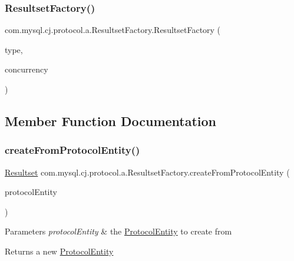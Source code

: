 \subsubsection{\texorpdfstring{Resultset\+Factory()}{ResultsetFactory()}}
{\footnotesize\ttfamily com.\+mysql.\+cj.\+protocol.\+a.\+Resultset\+Factory.\+Resultset\+Factory (\begin{DoxyParamCaption}\item[{\mbox{\hyperlink{enumcom_1_1mysql_1_1cj_1_1protocol_1_1_resultset_1_1_type}{Type}}}]{type,  }\item[{\mbox{\hyperlink{enumcom_1_1mysql_1_1cj_1_1protocol_1_1_resultset_1_1_concurrency}{Concurrency}}}]{concurrency }\end{DoxyParamCaption})}



\subsection{Member Function Documentation}
\mbox{\label{classcom_1_1mysql_1_1cj_1_1protocol_1_1a_1_1_resultset_factory_a3ee901bd2ae369a6c99f8c38c280c407}} 
\subsubsection{\texorpdfstring{create\+From\+Protocol\+Entity()}{createFromProtocolEntity()}}
{\footnotesize\ttfamily \mbox{\hyperlink{interfacecom_1_1mysql_1_1cj_1_1protocol_1_1_resultset}{Resultset}} com.\+mysql.\+cj.\+protocol.\+a.\+Resultset\+Factory.\+create\+From\+Protocol\+Entity (\begin{DoxyParamCaption}\item[{\mbox{\hyperlink{interfacecom_1_1mysql_1_1cj_1_1protocol_1_1_protocol_entity}{Protocol\+Entity}}}]{protocol\+Entity }\end{DoxyParamCaption})}


\begin{DoxyParams}{Parameters}
{\em protocol\+Entity} & the \mbox{\hyperlink{interfacecom_1_1mysql_1_1cj_1_1protocol_1_1_protocol_entity}{Protocol\+Entity}} to create from \\
\hline
\end{DoxyParams}
\begin{DoxyReturn}{Returns}
a new \mbox{\hyperlink{interfacecom_1_1mysql_1_1cj_1_1protocol_1_1_protocol_entity}{Protocol\+Entity}} 
\end{DoxyReturn}


